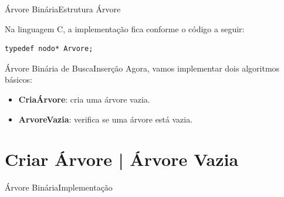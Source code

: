 \documentclass[aspectratio=169]{beamer}
\begin{document}

\begin{frame}[fragile]{Árvore Binária}{Estrutura Árvore}
\begin{algorithm}[H]
\caption{Arvore} 
\label{Arvore}
\end{algorithm} 
Na linguagem C, a implementação fica conforme o código a seguir:
\begin{lstlisting}[style=CStyle]
typedef nodo* Arvore;
\end{lstlisting}  

\end{frame}



\begin{frame}{Árvore Binária de Busca}{Inserção}
Agora, vamos implementar dois algoritmos básicos:
\begin{itemize}
 \item {\bf CriaÁrvore}: cria uma árvore vazia.
 \item {\bf ArvoreVazia}: verifica se uma árvore está vazia.
\end{itemize}
\end{frame}
\section{Criar Árvore | Árvore Vazia}

\begin{frame}{Árvore Binária}{Implementação}
\begin{algorithm}[H]
\caption{CriaÁrvore} 
\label{CriaArvore}
\end{algorithm}
\begin{algorithm}[H]
\caption{ÁrvoreVazia} 
\label{ArvoreVazia}
\end{algorithm}
\end{frame}

\end{document}
